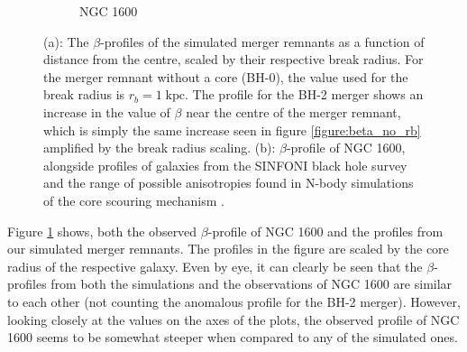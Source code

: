 \documentclass[english, oneside]{HYgradu}
\begin{document}
\begin{figure}
\begin{subfigure}[b]{0.60\textwidth}
		\caption{NGC 1600}
	\end{subfigure}
	\caption{(a): The $\beta$-profiles of the simulated merger remnants as a function of distance from the centre, scaled by their respective break radius. For the merger remnant without a core (BH-0), the value used for the break radius is $r_b = 1 \; \mathrm{kpc}$. The profile for the BH-2 merger shows an increase in the value of $\beta$ near the centre of the merger remnant, which is simply the same increase seen in figure \ref{figure:beta_no_rb} amplified by the break radius scaling. (b): $\beta$-profile of NGC 1600, alongside profiles of galaxies from the SINFONI black hole survey \citep{Saglia2016} and the range of possible anisotropies found in N-body simulations of the core scouring mechanism \citep{Thomas2016}.}
	\label{figure:beta_NGC1600_Simul}
\end{figure}

Figure \ref{figure:beta_NGC1600_Simul} shows, both the observed $\beta$-profile of NGC 1600 and the profiles from our simulated merger remnants. The profiles in the figure are scaled by the core radius of the respective galaxy. Even by eye, it can clearly be seen that the $\beta$-profiles from both the simulations and the observations of NGC 1600 are similar to each other (not counting the anomalous profile for the BH-2 merger). However, looking closely at the values on the axes of the plots, the observed profile of NGC 1600 seems to be somewhat steeper when compared to any of the simulated ones.

\end{document}
